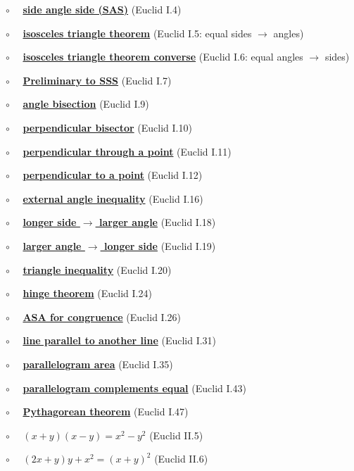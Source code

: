 \documentclass[11pt, oneside]{article}
\begin{document}
$\circ$ \ \ \hyperref[sec:Euclid_I_4]{\textbf{side angle side (SAS)}} (Euclid I.4)

$\circ$ \ \ \hyperref[sec:Euclid_I_5]{\textbf{isosceles triangle theorem}} (Euclid I.5:  equal sides $\rightarrow$ angles)

$\circ$ \ \ \hyperref[sec:Euclid_I_6]{\textbf{isosceles triangle theorem converse}} (Euclid I.6:  equal angles $\rightarrow$ sides)

$\circ$ \ \ \hyperref[sec:Euclid_I_7]{\textbf{Preliminary to SSS}} (Euclid I.7)

$\circ$ \ \ \hyperref[sec:Euclid_I_9]{\textbf{angle bisection}} (Euclid I.9)

$\circ$ \ \ \hyperref[sec:Euclid_I_10]{\textbf{perpendicular bisector}} (Euclid I.10)

$\circ$ \ \ \hyperref[sec:Euclid_I_11]{\textbf{perpendicular through a point}} (Euclid I.11)

$\circ$ \ \ \hyperref[sec:Euclid_I_12]{\textbf{perpendicular to a point}} (Euclid I.12)

$\circ$ \ \ \hyperref[sec:Euclid_I_16]{\textbf{external angle inequality}} (Euclid I.16)

$\circ$ \ \ \hyperref[sec:Euclid_I_18]{\textbf{longer side $\rightarrow$ larger angle}}  (Euclid I.18)

$\circ$ \ \ \hyperref[sec:Euclid_I_19]{\textbf{larger angle $\rightarrow$ longer side}} (Euclid I.19)

$\circ$ \ \ \hyperref[sec:triangle_inequality]{\textbf{triangle inequality}} (Euclid I.20)

$\circ$ \ \ \hyperref[sec:hinge_theorem]{\textbf{hinge theorem}} (Euclid I.24)

$\circ$ \ \ \hyperref[sec:ASA]{\textbf{ASA for congruence}} (Euclid I.26)

$\circ$ \ \ \hyperref[sec:Euclid_I_31]{\textbf{line parallel to another line}} (Euclid I.31)

$\circ$ \ \ \hyperref[sec:Euclid_I_35]{\textbf{parallelogram area}} (Euclid I.35)

$\circ$ \ \ \hyperref[sec:Euclid_I_43]{\textbf{parallelogram complements equal}} (Euclid I.43)

$\circ$ \ \ \hyperref[sec:Euclid_I_47]{\textbf{Pythagorean theorem}} (Euclid I.47)

$\circ$ \ \ \hyperref[sec:Euclid_II_5]{\textbf{$(x+y)(x-y)=x^2 - y^2$}} (Euclid II.5)

$\circ$ \ \ \hyperref[sec:Euclid_II_6]{\textbf{$(2x + y) y + x^2 = (x + y)^2$}} (Euclid II.6)
\end{document}
